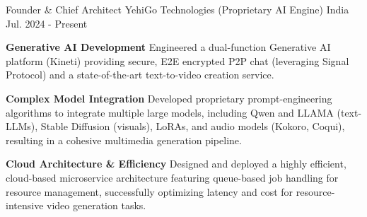 
\begin{cventries}


    
    
	\cventry
	{Founder \& Chief Architect} %
	{YehiGo Technologies (Proprietary AI Engine)} %
	{India} %
	{Jul. 2024 - Present} %
	{
		\begin{cvitems} %
			\item {\textbf{Generative AI Development} Engineered a dual-function Generative AI platform (Kineti) providing secure, E2E encrypted P2P chat (leveraging Signal Protocol) and a state-of-the-art text-to-video creation service.}
			\item {\textbf{Complex Model Integration} Developed proprietary prompt-engineering algorithms to integrate multiple large models, including Qwen and LLAMA (text-LLMs), Stable Diffusion (visuals), LoRAs, and audio models (Kokoro, Coqui), resulting in a cohesive multimedia generation pipeline.}
			\item {\textbf{Cloud Architecture \& Efficiency} Designed and deployed a highly efficient, cloud-based microservice architecture featuring queue-based job handling for resource management, successfully optimizing latency and cost for resource-intensive video generation tasks.}
			 \item[]
		\end{cvitems}
	}

		

\end{cventries}
